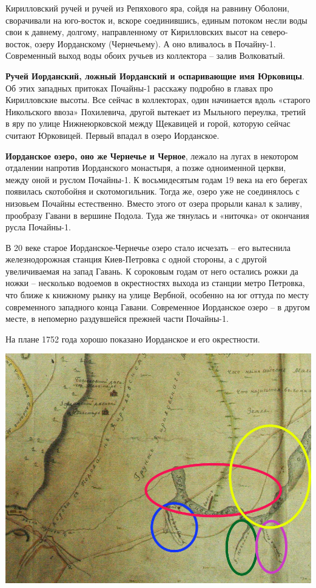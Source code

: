 Кирилловский ручей и ручей из Репяхового яра, сойдя на равнину Оболони, сворачивали на юго-восток и, вскоре соединившись, единым потоком несли воды свои к давнему, долгому, направленному от Кирилловских высот на северо-восток, озеру Иорданскому (Чернечьему). А оно вливалось в Почайну-1. Современный выход воды обоих ручьев из коллектора – залив Волковатый.
 
\textbf{Ручей Иорданский, ложный Иорданский и оспаривающие имя Юрковицы}. Об этих западных притоках Почайны-1 расскажу подробно в главах про Кирилловские высоты. Все сейчас в коллекторах, один начинается вдоль «старого Никольского ввоза» Похилевича, другой вытекает из Мыльного переулка, третий в яру по улице Нижнеюрковской между Щекавицей и горой, которую сейчас считают Юрковицей. Первый впадал в озеро Иорданское.

\textbf{Иорданское озеро, оно же Чернечье и Черное}, лежало на лугах в некотором отдалении напротив Иорданского монастыря, а позже одноименной церкви, между оной и руслом Почайны-1. К восьмидесятым годам 19 века на его берегах появилась скотобойня и скотомогильник. Тогда же, озеро уже не соединялось с низовьем Почайны естественно. Вместо этого от озера прорыли канал к заливу, прообразу Гавани в вершине Подола. Туда же тянулась и «ниточка» от окончания русла Почайны-1.

В 20 веке старое Иорданское-Чернечье озеро стало исчезать – его вытеснила железнодорожная станция Киев-Петровка с одной стороны, а с другой увеличиваемая на запад Гавань. К сороковым годам от него остались рожки да ножки – несколько водоемов в окрестностях выхода из станции метро Петровка, что ближе к книжному рынку на улице Вербной, особенно на юг оттуда по месту современного западного конца Гавани. Современное Иорданское озеро – в другом месте, в непомерно раздувшейся прежней части Почайны-1.

На плане 1752 года хорошо показано Иорданское и его окрестности.

\begin{center}
\includegraphics[width=\linewidth]{chast-colebanie-osnov/pochayna/1752-chern.jpg}
\end{center}

